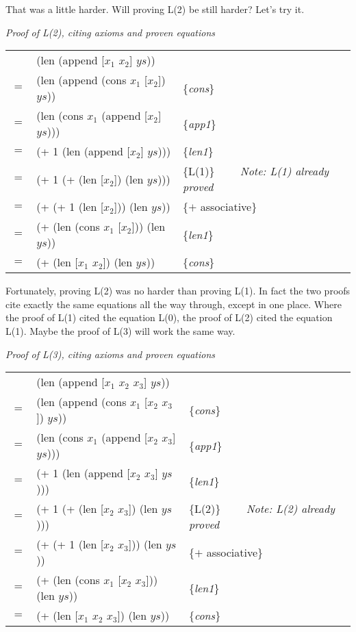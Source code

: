 That was a little harder. Will proving L(2) be still harder? Let's try it.

\begin{center}
\emph{Proof of L(2), citing axioms and proven equations}\\
\begin{tabular}{lll}
    & (len (append [$x_1$ $x_2$] $ys$))         &                     \\
$=$ & (len (append (cons $x_1$ [$x_2$]) $ys$))  & \{\emph{cons}\}     \\
$=$ & (len (cons $x_1$ (append [$x_2$] $ys$)))  & \{\emph{app1}\}     \\
$=$ & (+ 1 (len (append [$x_2$] $ys$)))         & \{\emph{len1}\}     \\
$=$ & (+ 1 (+ (len [$x_2$]) (len $ys$)))        & \{L(1)\} ~~~~\emph{Note: L(1) already proved}\\
$=$ & (+ (+ 1 (len [$x_2$])) (len $ys$))        & \{$+$ associative\} \\
$=$ & (+ (len (cons $x_1$ [$x_2$])) (len $ys$)) & \{\emph{len1}\}     \\
$=$ & (+ (len [$x_1$ $x_2$]) (len $ys$))        & \{\emph{cons}\}     \\
\end{tabular}
\end{center}

Fortunately, proving L(2) was no harder than proving L(1).
In fact the two proofs cite exactly the same equations all the way through,
except in one place.
Where the proof of L(1) cited the equation L(0),
the proof of L(2) cited the equation L(1).
Maybe the proof of L(3) will work the same way.

\begin{center}
\emph{Proof of L(3), citing axioms and proven equations}\\
\begin{tabular}{lll}
    & (len (append [$x_1$ $x_2$ $x_3$] $ys$))         &                     \\
$=$ & (len (append (cons $x_1$ [$x_2$ $x_3$]) $ys$))  & \{\emph{cons}\}     \\
$=$ & (len (cons $x_1$ (append [$x_2$ $x_3$] $ys$)))  & \{\emph{app1}\}     \\
$=$ & (+ 1 (len (append [$x_2$ $x_3$] $ys$)))         & \{\emph{len1}\}     \\
$=$ & (+ 1 (+ (len [$x_2$ $x_3$]) (len $ys$)))        & \{L(2)\} ~~~~\emph{Note: L(2) already proved}\\
$=$ & (+ (+ 1 (len [$x_2$ $x_3$])) (len $ys$))        & \{$+$ associative\} \\
$=$ & (+ (len (cons $x_1$ [$x_2$ $x_3$])) (len $ys$)) & \{\emph{len1}\}     \\
$=$ & (+ (len [$x_1$ $x_2$ $x_3$]) (len $ys$))        & \{\emph{cons}\}     \\
\end{tabular}
\end{center}

